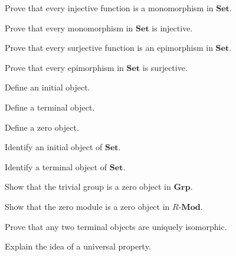 \begin{exercise}[2]
Prove that every injective function is a monomorphism in \(\mathbf{Set}\).
\end{exercise}

\begin{exercise}[2]
Prove that every monomorphism in \(\mathbf{Set}\) is injective.
\end{exercise}

\begin{exercise}[2]
Prove that every surjective function is an epimorphism in \(\mathbf{Set}\).
\end{exercise}

\begin{exercise}[2]
Prove that every epimorphism in \(\mathbf{Set}\) is surjective.
\end{exercise}

\begin{exercise}[1]
Define an initial object.
\end{exercise}

\begin{exercise}[1]
Define a terminal object.
\end{exercise}

\begin{exercise}[1]
Define a zero object.
\end{exercise}

\begin{exercise}[2]
Identify an initial object of \(\mathbf{Set}\).
\end{exercise}

\begin{exercise}[2]
Identify a terminal object of \(\mathbf{Set}\).
\end{exercise}

\begin{exercise}[2]
Show that the trivial group is a zero object in \(\mathbf{Grp}\).
\end{exercise}

\begin{exercise}[2]
Show that the zero module is a zero object in \(R\text{-}\mathbf{Mod}\).
\end{exercise}

\begin{exercise}[2]
Prove that any two terminal objects are uniquely isomorphic.
\end{exercise}

\begin{exercise}[1]
Explain the idea of a universal property.
\end{exercise}

